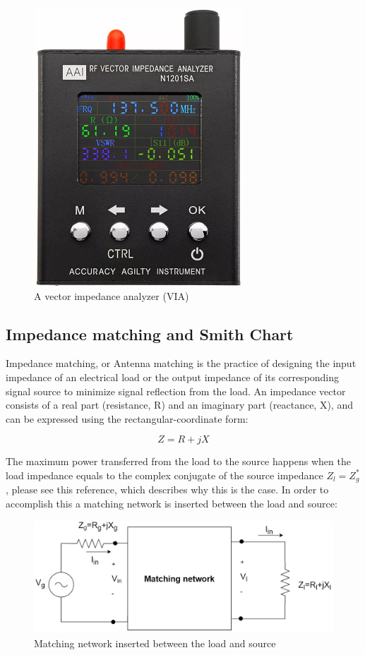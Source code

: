 \begin{figure}[h]
\centering
\includegraphics[scale=0.7]{figures/VIA.PNG}
\caption{A vector impedance analyzer (VIA)}
\end{figure}

\subsection{Impedance matching and Smith Chart}
Impedance matching, or Antenna matching is the practice of designing the input impedance of an electrical load or the output impedance of its corresponding signal source to minimize signal reflection from the load. An impedance vector consists of a real part (resistance, R) and an imaginary part (reactance, X), and can be expressed using the rectangular-coordinate form:

\begin{equation}
   Z = R + jX
\end{equation}

The maximum power transferred from the load to the source happens when the load impedance equals to the complex conjugate of the source impedance $Z_l = Z_g^*$, please see this reference\cite{ImpedanceMatching}, which describes why this is the case. In order to accomplish this a matching network is inserted between the load and source:

\begin{figure}[h]
\hspace{-1.5cm}
\includegraphics[scale=0.6]{figures/MatchingNetwork.PNG}
\caption{Matching network inserted between the load and source}
\end{figure}


